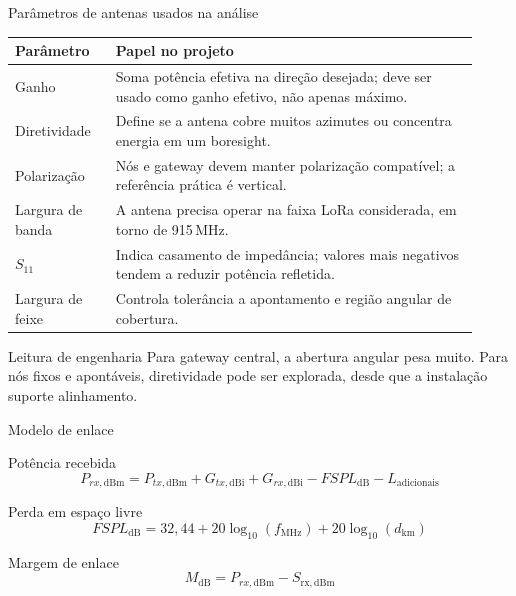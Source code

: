 \documentclass[aspectratio=169]{beamer}
\newcommand{\SI}[2]{#1\,#2}
\begin{document}
\begin{frame}{Parâmetros de antenas usados na análise}
\small
\begin{table}
\centering
\scriptsize
\begin{tabular}{p{0.20\linewidth}p{0.72\linewidth}}
\toprule
Parâmetro & Papel no projeto \\
\midrule
Ganho & Soma potência efetiva na direção desejada; deve ser usado como ganho efetivo, não apenas máximo. \\
Diretividade & Define se a antena cobre muitos azimutes ou concentra energia em um boresight. \\
Polarização & Nós e gateway devem manter polarização compatível; a referência prática é vertical. \\
Largura de banda & A antena precisa operar na faixa LoRa considerada, em torno de \SI{915}{MHz}. \\
$S_{11}$ & Indica casamento de impedância; valores mais negativos tendem a reduzir potência refletida. \\
Largura de feixe & Controla tolerância a apontamento e região angular de cobertura. \\
\bottomrule
\end{tabular}
\end{table}
\begin{block}{Leitura de engenharia}
Para gateway central, a abertura angular pesa muito. Para nós fixos e apontáveis, diretividade pode ser explorada, desde que a instalação suporte alinhamento.
\end{block}
\end{frame}

\begin{frame}{Modelo de enlace}
\small
\begin{block}{Potência recebida}
\[
P_{rx,\mathrm{dBm}} =
P_{tx,\mathrm{dBm}} + G_{tx,\mathrm{dBi}} + G_{rx,\mathrm{dBi}}
- FSPL_{\mathrm{dB}} - L_{\mathrm{adicionais}}
\]
\end{block}
\begin{block}{Perda em espaço livre}
\[
FSPL_{\mathrm{dB}} = 32{,}44 + 20\log_{10}(f_{\mathrm{MHz}}) + 20\log_{10}(d_{\mathrm{km}})
\]
\end{block}
\begin{block}{Margem de enlace}
\[
M_{\mathrm{dB}} = P_{rx,\mathrm{dBm}} - S_{\mathrm{rx,dBm}}
\]
\end{block}
\end{frame}
\end{document}

